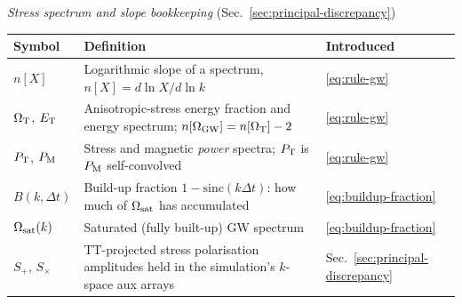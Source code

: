 \documentclass[10pt,prd,aps,nobibnotes,superscriptaddress,preprintnumbers,notitlepage]{revtex4-1}
\begin{document}
\medskip\noindent \emph{Stress spectrum and slope bookkeeping} (Sec.~\ref{sec:principal-discrepancy})\par\nobreak\smallskip
\noindent\begin{tabular}{@{}p{} p{} p{}@{}}
\hline\hline
Symbol & Definition & Introduced \\
\hline
$n[X]$                & Logarithmic slope of a spectrum, $n[X]=d\ln X/d\ln k$ & \eqref{eq:rule-gw}\\
$\Omega_{\rm T}$, $E_{\rm T}$ & Anisotropic-stress energy fraction and energy spectrum; $n[\Omega_{\rm GW}]=n[\Omega_{\rm T}]-2$ & \eqref{eq:rule-gw}\\
$P_{\rm T}$, $P_{\rm M}$ & Stress and magnetic \emph{power} spectra; $P_{\rm T}$ is $P_{\rm M}$ self-convolved & \eqref{eq:rule-gw}\\
$B(k,\Delta t)$      & Build-up fraction $1-\mathrm{sinc}(k\Delta t)$: how much of $\Omega_{\rm sat}$ has accumulated & \eqref{eq:buildup-fraction}\\
$\Omega_{\rm sat}(k)$ & Saturated (fully built-up) GW spectrum & \eqref{eq:buildup-fraction}\\
$S_+$, $S_\times$    & TT-projected stress polarisation amplitudes held in the simulation's $k$-space aux arrays & Sec.~\ref{sec:principal-discrepancy}\\
\hline\hline
\end{tabular}\par
\end{document}
